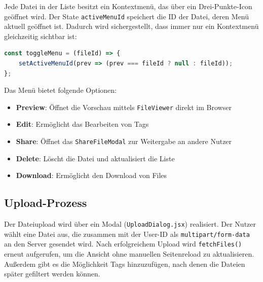 Jede Datei in der Liste besitzt ein Kontextmenü, das über ein Drei-Punkte-Icon geöffnet wird. Der State \texttt{activeMenuId} speichert die ID der Datei, deren Menü aktuell geöffnet ist. Dadurch wird sichergestellt, dass immer nur ein Kontextmenü gleichzeitig sichtbar ist:

\begin{lstlisting}[language=JavaScript, caption={Menüsteuerung über activeMenuId}]
const toggleMenu = (fileId) => {
    setActiveMenuId(prev => (prev === fileId ? null : fileId));
};
\end{lstlisting}

Das Menü bietet folgende Optionen:
\begin{itemize}
    \item \textbf{Preview}: Öffnet die Vorschau mittels \texttt{FileViewer} direkt im Browser
    \item \textbf{Edit}: Ermöglicht das Bearbeiten von Tags
    \item \textbf{Share}: Öffnet das \texttt{ShareFileModal} zur Weitergabe an andere Nutzer
    \item \textbf{Delete}: Löscht die Datei und aktualisiert die Liste
    \item \textbf{Download}: Ermöglicht den Download von Files
\end{itemize}

\subsection{Upload-Prozess}

Der Dateiupload wird über ein Modal (\texttt{UploadDialog.jsx}) realisiert. Der Nutzer wählt eine Datei aus, die zusammen mit der User-ID als \texttt{multipart/form-data}~\cite{MDNFormData} an den Server gesendet wird. Nach erfolgreichem Upload wird \texttt{fetchFiles()} erneut aufgerufen, um die Ansicht ohne manuellen Seitenreload zu aktualisieren. Außerdem gibt es die Möglichkeit Tags hinzuzufügen, nach denen die Dateien später gefiltert werden können.
\newpage

